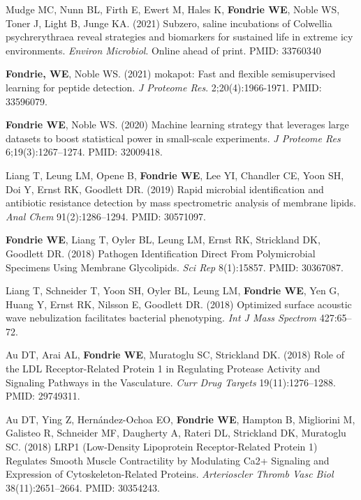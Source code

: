 \documentclass[11pt]{article}
\begin{document}
\begin{etaremune}

  \item Mudge MC, Nunn BL, Firth E, Ewert M, Hales K, \textbf{Fondrie WE},
  Noble WS, Toner J, Light B, Junge KA. (2021) Subzero, saline incubations of
  Colwellia psychrerythraea reveal strategies and biomarkers for sustained life
  in extreme icy environments. \textit{Environ Microbiol}. Online ahead of
  print. PMID: 33760340

  \item \textbf{Fondrie, WE}, Noble WS. (2021) mokapot: Fast and flexible
  semisupervised learning for peptide detection. \textit{J Proteome Res}.
  2;20(4):1966-1971. PMID: 33596079.

  \item \textbf{Fondrie WE}, Noble WS. (2020) Machine learning strategy that
  leverages large datasets to boost statistical power in small-scale
  experiments. \textit{J Proteome Res} 6;19(3):1267--1274. PMID: 32009418.
  
  \item Liang T, Leung LM, Opene B, \textbf{Fondrie WE}, Lee YI, Chandler CE,
  Yoon SH, Doi Y, Ernst RK, Goodlett DR. (2019) Rapid microbial identification
  and antibiotic resistance detection by mass spectrometric analysis of
  membrane lipids. \textit{Anal Chem} 91(2):1286--1294. PMID: 30571097.

  \item \textbf{Fondrie WE}, Liang T, Oyler BL, Leung LM, Ernst RK, Strickland
  DK, Goodlett DR. (2018) Pathogen Identification Direct From Polymicrobial
  Specimens Using Membrane Glycolipids. \textit{Sci Rep} 8(1):15857. PMID:
  30367087.
    
  \item Liang T, Schneider T, Yoon SH, Oyler BL, Leung LM, \textbf{Fondrie WE},
  Yen G, Huang Y, Ernst RK, Nilsson E, Goodlett DR. (2018) Optimized surface
  acoustic wave nebulization facilitates bacterial phenotyping. \textit{Int J
    Mass Spectrom} 427:65--72.
    
  \item Au DT, Arai AL, \textbf{Fondrie WE}, Muratoglu SC, Strickland DK.
  (2018) Role of the LDL Receptor-Related Protein 1 in Regulating Protease
  Activity and Signaling Pathways in the Vasculature. \textit{Curr Drug
    Targets} 19(11):1276--1288. PMID: 29749311.

  \item Au DT, Ying Z, Hernández-Ochoa EO, \textbf{Fondrie WE}, Hampton B,
  Migliorini M, Galisteo R, Schneider MF, Daugherty A, Rateri DL, Strickland
  DK, Muratoglu SC. (2018) LRP1 (Low-Density Lipoprotein Receptor-Related
  Protein 1) Regulates Smooth Muscle Contractility by Modulating Ca2+ Signaling
  and Expression of Cytoskeleton-Related Proteins. \textit{Arterioscler Thromb
    Vasc Biol} 38(11):2651--2664. PMID: 30354243.
    

\end{etaremune}
\end{document}
